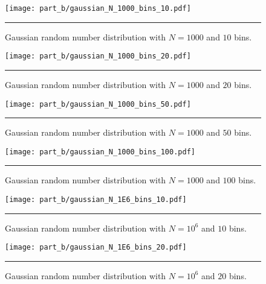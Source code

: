 \documentclass[notitlepage,aps,prd,nofootinbib]{revtex4-1}
\begin{document}
\begin{figure}[!htbc]
  \centering
  \texttt{[image: part\_b/gaussian\_N\_1000\_bins\_10.pdf]}
	{\par\nobreak\rule[9pt]{35em}{0.5pt}\vspace{-5mm}}
	\caption{Gaussian random number distribution with $N = 1000$ and $10$ bins.}
	\label{fig:gaussian_N_1000_bins_10}
\end{figure}

\begin{figure}[!htbc]
  \centering
  \texttt{[image: part\_b/gaussian\_N\_1000\_bins\_20.pdf]}
	{\par\nobreak\rule[9pt]{35em}{0.5pt}\vspace{-5mm}}
	\caption{Gaussian random number distribution with $N = 1000$ and $20$ bins.}
	\label{fig:gaussian_N_1000_bins_20}
\end{figure}

\begin{figure}[!htbc]
  \centering
  \texttt{[image: part\_b/gaussian\_N\_1000\_bins\_50.pdf]}
	{\par\nobreak\rule[9pt]{35em}{0.5pt}\vspace{-5mm}}
	\caption{Gaussian random number distribution with $N = 1000$ and $50$ bins.}
	\label{fig:gaussian_N_1000_bins_50}
\end{figure}

\begin{figure}[!htbc]
  \centering
  \texttt{[image: part\_b/gaussian\_N\_1000\_bins\_100.pdf]}
	{\par\nobreak\rule[9pt]{35em}{0.5pt}\vspace{-5mm}}
	\caption{Gaussian random number distribution with $N = 1000$ and $100$ bins.}
	\label{fig:gaussian_N_1000_bins_100}
\end{figure}

\clearpage

\begin{figure}[!htbc]
  \centering
  \texttt{[image: part\_b/gaussian\_N\_1E6\_bins\_10.pdf]}
	{\par\nobreak\rule[9pt]{35em}{0.5pt}\vspace{-5mm}}
	\caption{Gaussian random number distribution with $N = 10^6$ and $10$ bins.}
	\label{fig:gaussian_N_1E6_bins_10}
\end{figure}

\begin{figure}[!htbc]
  \centering
  \texttt{[image: part\_b/gaussian\_N\_1E6\_bins\_20.pdf]}
	{\par\nobreak\rule[9pt]{35em}{0.5pt}\vspace{-5mm}}
	\caption{Gaussian random number distribution with $N = 10^6$ and $20$ bins.}
	\label{fig:gaussian_N_1E6_bins_20}
\end{figure}
\end{document}
